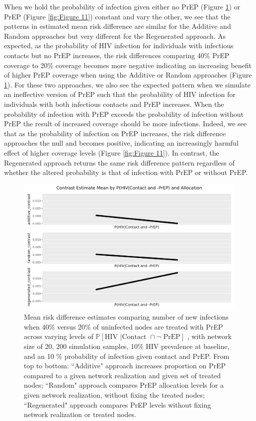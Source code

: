 \documentclass{article}
\theoremstyle{definition}
\begin{document}
When we hold the probability of infection given either no PrEP (Figure \ref{fig:Figure 10}) or PrEP (Figure \ref{fig:Figure 11}) constant and vary the other, we see that the patterns in estimated mean risk difference are similar for the Additive and Random approaches but very different for the Regenerated approach. As expected, as the probability of HIV infection for individuals with  infectious contacts but no PrEP increases, the risk differences comparing 40\% PrEP coverage to 20\% coverage becomes more negative indicating an increasing benefit of higher PrEP coverage when using the Additive or Random approaches (Figure \ref{fig:Figure 10}). For these two approaches, we also see the expected pattern when we simulate an ineffective version of PrEP such that the probability of HIV infection for individuals with both infectious contacts and PrEP increases. When the probability of infection with PrEP exceeds the probability of infection without PrEP the result of increased coverage should be more infections. Indeed, we see that as the probability of infection on PrEP increases, the risk difference approaches the null and becomes positive, indicating an increasingly harmful effect of higher coverage levels (Figure \ref{fig:Figure 11}). In contrast, the Regenerated approach returns the same risk difference pattern regardless of whether the altered probability is that of infection with PrEP or without PrEP.


\begin{figure}[H]
    \centering
    \includegraphics[width=\linewidth]{Corrected Figures/p1 Mean plots.png}
    \caption{Mean risk difference estimates comparing number of new infections when 40\% versus 20\% of uninfected nodes are treated with PrEP across varying levels of  $\mathbb{P}\left[\text{HIV } \vert \text {Contact } \cap \neg \text{ PrEP}\right]$ , with network size of 20,  200 simulation samples,  10\% HIV prevalence at baseline, and an 10 \% probability of infection given contact and PrEP.
    From top to bottom: ``Additive" approach increases proportion on PrEP compared to a given network realization and given set of treated nodes; ``Random" approach compares PrEP allocation levels for a given network realization, without fixing the treated nodes; ``Regenerated" approach compares PrEP levels without fixing network realization or treated nodes.}
    \label{fig:Figure 10}
\end{figure}
\end{document}
